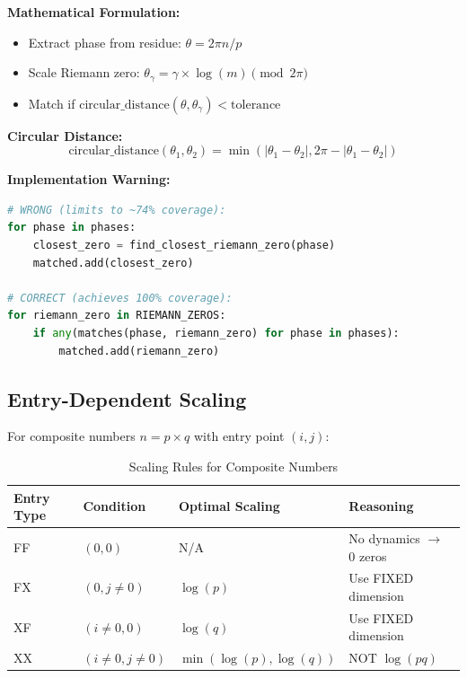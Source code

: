 \documentclass[11pt, a4paper]{article}
\begin{document}
\textbf{Mathematical Formulation:}
\begin{itemize}
    \item Extract phase from residue: $\theta = 2\pi n / p$
    \item Scale Riemann zero: $\theta_\gamma = \gamma \times \log(m) \pmod{2\pi}$
    \item Match if $\text{circular\_distance}(\theta, \theta_\gamma) < \text{tolerance}$
\end{itemize}

\textbf{Circular Distance:}
\[ \text{circular\_distance}(\theta_1, \theta_2) = \min(|\theta_1 - \theta_2|, 2\pi - |\theta_1 - \theta_2|) \]

\textbf{Implementation Warning:}
\begin{lstlisting}[language=Python, caption=Matching Algorithm logic]
# WRONG (limits to ~74% coverage):
for phase in phases:
    closest_zero = find_closest_riemann_zero(phase)
    matched.add(closest_zero)

# CORRECT (achieves 100% coverage):
for riemann_zero in RIEMANN_ZEROS:
    if any(matches(phase, riemann_zero) for phase in phases):
        matched.add(riemann_zero)
\end{lstlisting}


\subsection{Entry-Dependent Scaling}
For composite numbers $n = p \times q$ with entry point $(i, j)$:

\begin{table}[h]
\centering
\begin{tabular}{@{}llll@{}}
\toprule
\textbf{Entry Type} & \textbf{Condition} & \textbf{Optimal Scaling} & \textbf{Reasoning} \\ \midrule
FF & $(0, 0)$ & N/A & No dynamics $\to$ 0 zeros \\
FX & $(0, j\neq0)$ & $\log(p)$ & Use FIXED dimension \\
XF & $(i\neq0, 0)$ & $\log(q)$ & Use FIXED dimension \\
XX & $(i\neq0, j\neq0)$ & $\min(\log(p), \log(q))$ & NOT $\log(pq)$ \\ \bottomrule
\end{tabular}
\caption{Scaling Rules for Composite Numbers}
\end{table}
\end{document}
